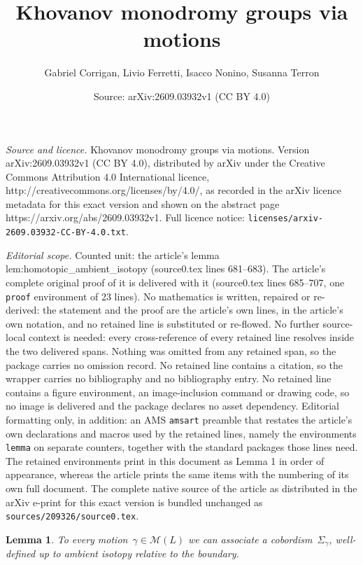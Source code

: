 \documentclass[10pt,a4paper]{amsart}
\title{Khovanov monodromy groups via motions}
\author{Gabriel Corrigan, Livio Ferretti, Isacco Nonino, Susanna Terron}
\date{Source: arXiv:2609.03932v1 (CC BY 4.0)}
\newtheorem{lemma}{Lemma}
\newcommand{\calM}{\mathcal{M}}
\begin{document}
\maketitle

\noindent\emph{Source and licence.} Khovanov monodromy groups via motions. Version arXiv:2609.03932v1 (CC BY 4.0), distributed by arXiv under the Creative Commons Attribution 4.0 International licence, http://creativecommons.org/licenses/by/4.0/, as recorded in the arXiv licence metadata for this exact version and shown on the abstract page https://arxiv.org/abs/2609.03932v1. Full licence notice: \texttt{licenses/arxiv-2609.03932-CC-BY-4.0.txt}.\par\smallskip

\noindent\textit{Editorial scope.} Counted unit: the article's lemma lem:homotopic\_ambient\_isotopy (source0.tex lines 681--683). The article's complete original proof of it is delivered with it (source0.tex lines 685--707, one \texttt{proof} environment of 23 lines). No mathematics is written, repaired or re-derived: the statement and the proof are the article's own lines, in the article's own notation, and no retained line is substituted or re-flowed.  No further source-local context is needed: every cross-reference of every retained line resolves inside the two delivered spans.  Nothing was omitted from any retained span, so the package carries no omission record.  No retained line contains a citation, so the wrapper carries no bibliography and no bibliography entry.  No retained line contains a figure environment, an image-inclusion command or drawing code, so no image is delivered and the package declares no asset dependency.  Editorial formatting only, in addition: an AMS \texttt{amsart} preamble that restates the article's own declarations and macros used by the retained lines, namely the environments \texttt{lemma} on separate counters, together with the standard packages those lines need.  The retained environments print in this document as Lemma 1 in order of appearance, whereas the article prints the same items with the numbering of its own full document.  The complete native source of the article as distributed in the arXiv e-print for this exact version is bundled unchanged as \texttt{sources/209326/source0.tex}.
\begin{lemma}\label{lem:homotopic_ambient_isotopy}
    To every motion~$\gamma \in\calM(L)$ we can associate a cobordism~$\Sigma_\gamma$, well-defined up to ambient isotopy relative to the boundary.
\end{lemma}
\end{document}
